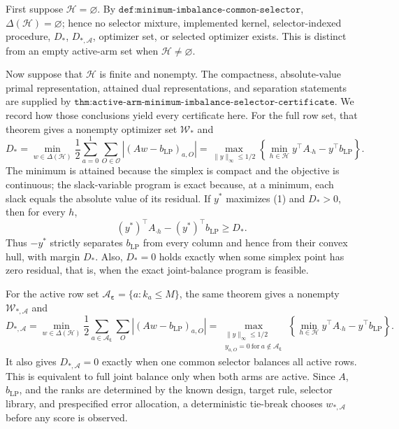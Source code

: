 First suppose \(\mathcal H=\varnothing\). By \(\texttt{def:minimum-imbalance-common-selector}\), \(\Delta(\mathcal H)=\varnothing\); hence no selector mixture, implemented kernel, selector-indexed procedure, \(D_*\), \(D_{*,\mathcal A}\), optimizer set, or selected optimizer exists. This is distinct from an empty active-arm set when \(\mathcal H\ne\varnothing\).

Now suppose that \(\mathcal H\) is finite and nonempty. The compactness, absolute-value primal representation, attained dual representations, and separation statements are supplied by \(\texttt{thm:active-arm-minimum-imbalance-selector-certificate}\). We record how those conclusions yield every certificate here. For the full row set, that theorem gives a nonempty optimizer set \(\mathcal W_*\) and
\[
D_*=\min_{w\in\Delta(\mathcal H)}\frac12\sum_{a=0}^1\sum_{O\in\mathcal O}|(Aw-b_{\mathrm{LP}})_{a,O}|
=\max_{\lVert y\rVert_\infty\le1/2}\left\{\min_{h\in\mathcal H}y^\top A_{\cdot h}-y^\top b_{\mathrm{LP}}\right\}.
\tag{1}
\]
The minimum is attained because the simplex is compact and the objective is continuous; the slack-variable program is exact because, at a minimum, each slack equals the absolute value of its residual. If \(y^*\) maximizes (1) and \(D_*>0\), then for every \(h\),
\[
(y^*)^\top A_{\cdot h}-(y^*)^\top b_{\mathrm{LP}}\ge D_*.
\]
Thus \(-y^*\) strictly separates \(b_{\mathrm{LP}}\) from every column and hence from their convex hull, with margin \(D_*\). Also, \(D_*=0\) holds exactly when some simplex point has zero residual, that is, when the exact joint-balance program is feasible.

For the active row set \(\mathcal A_{\boldsymbol\varepsilon}=\{a:k_a\le M\}\), the same theorem gives a nonempty \(\mathcal W_{*,\mathcal A}\) and
\[
D_{*,\mathcal A}=\min_{w\in\Delta(\mathcal H)}\frac12\sum_{a\in\mathcal A_{\boldsymbol\varepsilon}}\sum_O|(Aw-b_{\mathrm{LP}})_{a,O}|
=\max_{\substack{\lVert y\rVert_\infty\le1/2\\y_{a,O}=0\ \mathrm{for}\ a\notin\mathcal A_{\boldsymbol\varepsilon}}}\left\{\min_{h\in\mathcal H}y^\top A_{\cdot h}-y^\top b_{\mathrm{LP}}\right\}.
\tag{2}
\]
It also gives \(D_{*,\mathcal A}=0\) exactly when one common selector balances all active rows. This is equivalent to full joint balance only when both arms are active. Since \(A\), \(b_{\mathrm{LP}}\), and the ranks are determined by the known design, target rule, selector library, and prespecified error allocation, a deterministic tie-break chooses \(w_{*,\mathcal A}\) before any score is observed.


